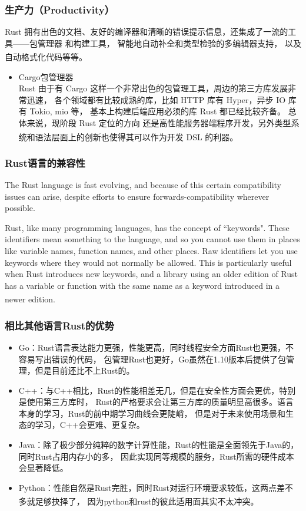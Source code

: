 \documentclass[UTF8,fontset=none,linespread=1.15]{ctexart}
\let\nosupcite\cite
\renewcommand*{\cite}[1]{\textsuperscript{\nosupcite{#1}}}
\begin{document}
\subsubsection{生产力（Productivity）}

Rust 拥有出色的文档、友好的编译器和清晰的错误提示信息，还集成了一流的工具——包管理器
和构建工具， 智能地自动补全和类型检验的多编辑器支持， 以及自动格式化代码等等。\cite{bib:1-rust-lang}

\begin{itemize}
\item Cargo包管理器\\
  Rust 由于有 Cargo 这样一个非常出色的包管理工具，周边的第三方库发展非常迅速，
  各个领域都有比较成熟的库，比如 HTTP 库有 Hyper，异步 IO 库有 Tokio, mio 等，
  基本上构建后端应用必须的库 Rust 都已经比较齐备。 总体来说，现阶段 Rust 定位的方向
  还是高性能服务器端程序开发，另外类型系统和语法层面上的创新也使得其可以作为开发 DSL
  的利器。\cite{bib:2-why-rust}\\
\end{itemize}
\subsubsection{Rust语言的兼容性}

The Rust language is fast evolving, and because of this certain compatibility
issues can arise, despite efforts to ensure forwards-compatibility wherever possible.

Rust, like many programming languages, has the concept of ``keywords". These
identifiers mean something to the language, and so you cannot use them in places
like variable names, function names, and other places. Raw identifiers let you use
keywords where they would not normally be allowed. This is particularly useful
when Rust introduces new keywords, and a library using an older edition of Rust
has a variable or function with the same name as a keyword introduced in a newer edition.\cite{bib:8-rust-compatibility}

\subsubsection{相比其他语言Rust的优势}

\begin{itemize}
\item Go：Rust语言表达能力更强，性能更高，同时线程安全方面Rust也更强，不容易写出错误的代码，
包管理Rust也更好，Go虽然在1.10版本后提供了包管理，但是目前还比不上Rust的。
\item C++：与C++相比，Rust的性能相差无几，但是在安全性方面会更优，特别是使用第三方库时，
Rust的严格要求会让第三方库的质量明显高很多。语言本身的学习，Rust的前中期学习曲线会更陡峭，
但是对于未来使用场景和生态的学习，C++会更难、更复杂。
\item Java：除了极少部分纯粹的数字计算性能，Rust的性能是全面领先于Java的，同时Rust占用内存小的多，
因此实现同等规模的服务，Rust所需的硬件成本会显著降低。
\item Python：性能自然是Rust完胜，同时Rust对运行环境要求较低，这两点差不多就足够抉择了，
因为python和rust的彼此适用面其实不太冲突。\cite{bib:5-why-rust2}
\end{itemize}
\end{document}

